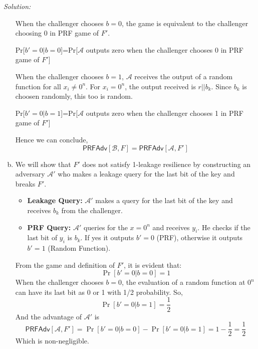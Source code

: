 \documentclass[a4paper, 11pt]{article}
\newenvironment{solution}
    {\textit{Solution:}}
    {\clearpage}
\newcommand{\prf}{\mathsf{PRFAdv}}
\newcommand{\calA}{\mathcal{A}}
\newcommand{\calB}{\mathcal{B}}
\begin{document}
\begin{solution}
\begin{enumerate}[(a)]
              When the challenger chooses $b=0$, the game is equivalent to the challenger choosing 0 in PRF game of $F'$.
              \begin{center}
                  Pr[$b'=0|b=0$]=Pr[$\calA$ outputs zero when the challenger chooses 0 in PRF game of $F'$]
              \end{center}
              When the challenger chooses $b=1$, $\calA$ receives the output of a random function for all $x_i\neq0^n$. For $x_i=0^n$, the output received is $r||b_k$. Since $b_k$ is choosen randomly, this too is random.
              \begin{center}
                  Pr[$b'=0|b=1$]=Pr[$\calA$ outputs zero when the challenger chooses 1 in PRF game of $F'$]
              \end{center}
              Hence we can conclude,
              $$\prf[\calB,F]=\prf[\calA,F']$$

        \item We will show that $F'$ does not satisfy 1-leakage resilience by constructing an adversary $\calA'$ who makes a leakage query for the last bit of the key and breaks $F'$.
              \begin{itemize}
                  \item \textbf{Leakage Query:} $\calA'$ makes a query for the last bit of the key and receives $b_k$ from the challenger.
                  \item \textbf{PRF Query:} $\calA'$ queries for the $x=0^n$ and receives $y_i$. He checks if the last bit of $y_i$ is $b_k$. If yes it outputs $b'=0$ (PRF), otherwise it outputs $b'=1$ (Random Function).
              \end{itemize}
              From the game and definition of $F'$, it is evident that:
              $$\Pr[b'=0|b=0]=1$$
              When the challenger chooses $b=0$, the evaluation of a random function at $0^n$ can have its last bit as 0 or 1 with 1/2 probability. So,
              $$\Pr[b'=0|b=1]=\frac12$$
              And the advantage of $\calA'$ is
              $$\prf[\calA,F']=\Pr[b'=0|b=0]-\Pr[b'=0|b=1]=1-\frac12=\frac12$$
              Which is non-negligible.
    \end{enumerate}
\end{solution}
\end{document}
